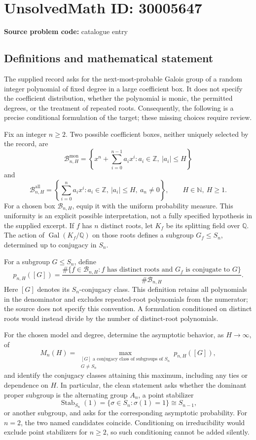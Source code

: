 \documentclass[11pt]{article}
\newcommand{\N}{\mathbb{N}}
\newcommand{\Z}{\mathbb{Z}}
\newcommand{\Q}{\mathbb{Q}}
\begin{document}
\section*{UnsolvedMath ID: 30005647}
\textbf{Source problem code:} catalogue entry
\subsection{Definitions and mathematical statement}
The supplied record asks for the next-most-probable Galois group of a random integer polynomial of fixed degree in a large coefficient box. It does not specify the coefficient distribution, whether the polynomial is monic, the permitted degrees, or the treatment of repeated roots. Consequently, the following is a precise conditional formulation of the target; these missing choices require review.

Fix an integer \(n\geq 2\). Two possible coefficient boxes, neither uniquely selected by the record, are
\[
\mathcal B^{\mathrm{mon}}_{n,H}=\left\{x^n+\sum_{i=0}^{n-1}a_i x^i:a_i\in\Z,\ |a_i|\leq H\right\}
\]
and
\[
\mathcal B^{\mathrm{all}}_{n,H}=\left\{\sum_{i=0}^{n}a_i x^i:a_i\in\Z,\ |a_i|\leq H,\ a_n\neq0\right\},
\qquad H\in\N,\ H\geq1.
\]
For a chosen box \(\mathcal B_{n,H}\), equip it with the uniform probability measure. This uniformity is an explicit possible interpretation, not a fully specified hypothesis in the supplied excerpt. If \(f\) has \(n\) distinct roots, let \(K_f\) be its splitting field over \(\Q\). The action of \(\operatorname{Gal}(K_f/\Q)\) on those roots defines a subgroup \(G_f\leq S_n\), determined up to conjugacy in \(S_n\).

For a subgroup \(G\leq S_n\), define
\[
p_{n,H}([G])=
\frac{\#\{f\in\mathcal B_{n,H}:f\text{ has distinct roots and }G_f\text{ is conjugate to }G\}}{\#\mathcal B_{n,H}}.
\]
Here \([G]\) denotes its \(S_n\)-conjugacy class. This definition retains all polynomials in the denominator and excludes repeated-root polynomials from the numerator; the source does not specify this convention. A formulation conditioned on distinct roots would instead divide by the number of distinct-root polynomials.

For the chosen model and degree, determine the asymptotic behavior, as \(H\to\infty\), of
\[
M_n(H)=\max_{\substack{[G]\text{ a conjugacy class}\text{ of subgroups of }S_n\\G\neq S_n}}p_{n,H}([G]),
\]
and identify the conjugacy classes attaining this maximum, including any ties or dependence on \(H\). In particular, the clean statement asks whether the dominant proper subgroup is the alternating group \(A_n\), a point stabilizer
\[
\operatorname{Stab}_{S_n}(1)=\{\sigma\in S_n:\sigma(1)=1\}\cong S_{n-1},
\]
or another subgroup, and asks for the corresponding asymptotic probability. For \(n=2\), the two named candidates coincide. Conditioning on irreducibility would exclude point stabilizers for \(n\geq2\), so such conditioning cannot be added silently.
\end{document}
